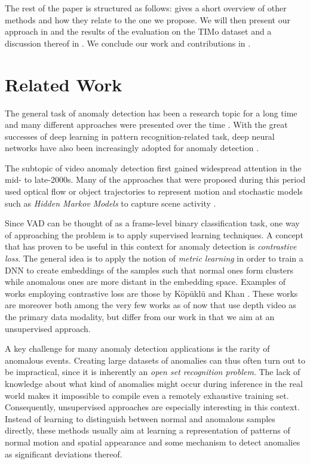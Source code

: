 \documentclass[10pt,twocolumn,letterpaper]{article}
\begin{document}
The rest of the paper is structured as follows:  gives a short overview of other methods and how they relate to the one we propose. We will then present our approach in  and the results of the evaluation on the TIMo dataset and a discussion thereof in . We conclude our work and contributions in .

\section{Related Work} \label{sec:rel_work}
The general task of anomaly detection has been a research topic for a long time and many different approaches were presented over the time \cite{outlier_analysis_book}. With the great successes of deep learning in pattern recognition-related task, deep neural networks have also been increasingly adopted for anomaly detection \cite{dl_for_ad_review, dl_for_vad_review, vad_overview_semisup_unsup}.

The subtopic of video anomaly detection first gained widespread attention in the mid- to late-2000s. Many of the approaches that were proposed during this period used optical flow or object trajectories to represent motion and stochastic models such as \emph{Hidden Markov Models} to capture scene activity \cite{vad_review_2012, unusual_event_detection_2008}. 

Since VAD can be thought of as a frame-level binary classification task, one way of approaching the problem is to apply supervised learning techniques. A concept that has proven to be useful in this context for anomaly detection is \emph{contrastive loss}. The general idea is to apply the notion of \emph{metric learning} in order to train a DNN to create embeddings of the samples such that normal ones form clusters while anomalous ones are more distant in the embedding space. Examples of works employing contrastive loss are those by Köpüklü \etal \cite{driver_anomaly_dataset} and Khan \etal \cite{modified_contr_learning_driving_ad}. These works are moreover both among the very few works as of now that use depth video as the primary data modality, but differ from our work in that we aim at an unsupervised approach.

A key challenge for many anomaly detection applications is the rarity of anomalous events. Creating large datasets of anomalies can thus often turn out to be impractical, since it is inherently an \emph{open set recognition problem}. The lack of knowledge about what kind of anomalies might occur during inference in the real world makes it impossible to compile even a remotely exhaustive training set. Consequently, unsupervised approaches are especially interesting in this context. Instead of learning to distinguish between normal and anomalous samples directly, these methods usually aim at learning a representation of patterns of normal motion and spatial appearance and some mechanism to detect anomalies as significant deviations thereof. 
\end{document}
